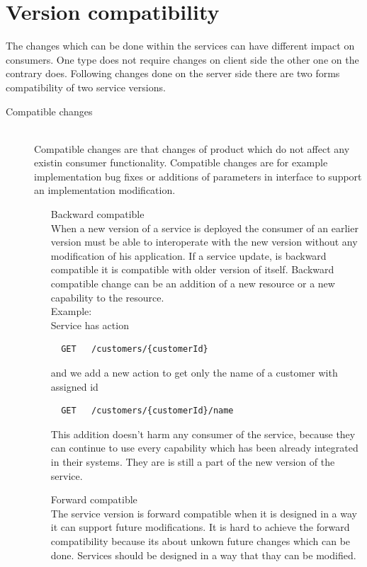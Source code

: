 \section{Version compatibility}
\label{sec:v-compat}
The changes which can be done within the services can have different impact on consumers. One type does not require changes on client side the other one on the contrary does. Following changes done on the server side there are two forms compatibility of two service versions. \cite{website:service-versioning}
\begin{description}
  \item[Compatible changes] \hfill \\
  Compatible changes are that changes of product which do not affect any existin consumer functionality. Compatible changes are for example implementation bug fixes or additions of parameters in interface to support an implementation modification.
  \begin{enumerate}
    \item[Backward compatible] \hfill \\ 
  When a new version of a service is deployed the consumer of an earlier version must be able to interoperate with the new version without any modification of his application. If a service update, is backward compatible it is compatible with older version of itself. Backward compatible change can be an addition of a new resource or a new capability to the resource. \hfill \\ 
  Example: \hfill \\ 
  Service has action \hfill \\ 
  \begin{lstlisting}
  GET   /customers/{customerId}
  \end{lstlisting}
  and we add a new action to get only the name of a customer with assigned id
  \begin{lstlisting}
  GET   /customers/{customerId}/name
  \end{lstlisting}

  This addition doesn't harm any consumer of the service, because they can continue to use every capability which has been already integrated in their systems. They are is still a part of the new version of the service. 
  
  \item[Forward compatible] \hfill \\
  The service version is forward compatible when it is designed in a way it can support future modifications. It is hard to achieve the forward compatibility because its about unkown future changes which can be done. Services should be designed in a way that thay can be modified.
  \end{enumerate}
  

\end{description}
